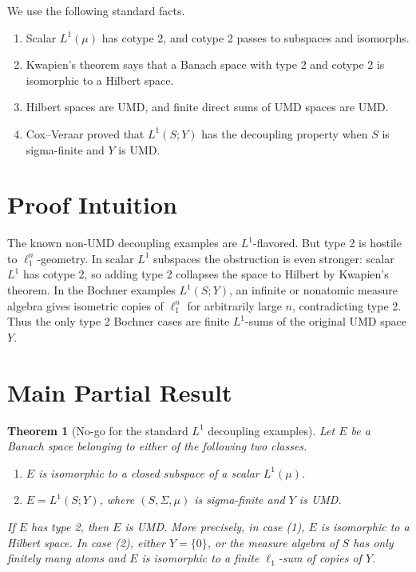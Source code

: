 \documentclass[11pt]{article}
\newtheorem{theorem}{Theorem}
\begin{document}
We use the following standard facts.
\begin{enumerate}
  \item Scalar \(L^1(\mu)\) has cotype 2, and cotype 2 passes to subspaces and
  isomorphs.
  \item Kwapien's theorem says that a Banach space with type 2 and cotype 2 is
  isomorphic to a Hilbert space.
  \item Hilbert spaces are UMD, and finite direct sums of UMD spaces are UMD.
  \item Cox--Veraar proved that \(L^1(S;Y)\) has the decoupling property when
  \(S\) is sigma-finite and \(Y\) is UMD.
\end{enumerate}

\section*{Proof Intuition}

The known non-UMD decoupling examples are \(L^1\)-flavored.  But type 2 is
hostile to \(\ell_1^n\)-geometry.  In scalar \(L^1\) subspaces the obstruction
is even stronger: scalar \(L^1\) has cotype 2, so adding type 2 collapses the
space to Hilbert by Kwapien's theorem.  In the Bochner examples \(L^1(S;Y)\),
an infinite or nonatomic measure algebra gives isometric copies of
\(\ell_1^n\) for arbitrarily large \(n\), contradicting type 2.  Thus the only
type 2 Bochner cases are finite \(L^1\)-sums of the original UMD space \(Y\).

\section*{Main Partial Result}

\begin{theorem}[No-go for the standard \(L^1\) decoupling examples]
Let \(E\) be a Banach space belonging to either of the following two classes.
\begin{enumerate}
  \item \(E\) is isomorphic to a closed subspace of a scalar \(L^1(\mu)\).
  \item \(E=L^1(S;Y)\), where \((S,\Sigma,\mu)\) is sigma-finite and \(Y\) is
  UMD.
\end{enumerate}
If \(E\) has type 2, then \(E\) is UMD.  More precisely, in case (1), \(E\) is
isomorphic to a Hilbert space.  In case (2), either \(Y=\{0\}\), or the measure
algebra of \(S\) has only finitely many atoms and \(E\) is isomorphic to a
finite \(\ell_1\)-sum of copies of \(Y\).
\end{theorem}
\end{document}
